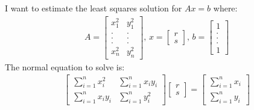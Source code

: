 \documentclass[12pt]{article}
\newenvironment{problem}[2][Problem]{\begin{trivlist}
\item[\hskip \labelsep {\bfseries #1}\hskip \labelsep {\bfseries #2.}]}{\end{trivlist}}
\theoremstyle{definition}
\theoremstyle{definition}
\theoremstyle{definition}
\theoremstyle{definition}
\begin{document}
\begin{problem}{3.50}
I want to estimate the least squares solution for $Ax = b$ where:
\begin{align*}
A = \begin{bmatrix}
x_1^2 & y_1^2 \\
. & . \\
. & . \\
. & . \\
x_n^2 & y_n^2
\end{bmatrix} \text{,  }
x = \begin{bmatrix}
r \\
s
\end{bmatrix} \text{,  }
b = \begin{bmatrix}
1 \\
. \\
. \\
. \\
1
\end{bmatrix}
\end{align*}
The normal equation to solve is:
\begin{align*}
\begin{bmatrix}
\sum_{i=1}^n x_i^2 & \sum_{i=1}^n x_iy_i \\
\sum_{i=1}^n x_iy_i & \sum_{i=1}^n y_i^2
\end{bmatrix}
\begin{bmatrix}
r \\
s
\end{bmatrix} = \begin{bmatrix}
\sum_{i=1}^n x_i \\
\sum_{i=1}^n y_i
\end{bmatrix}
\end{align*} 
\end{problem}
\end{document}
